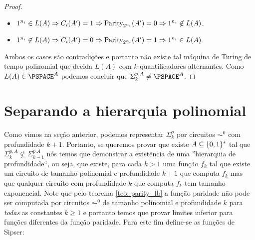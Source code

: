 \begin{proof}
\begin{itemize}

    \item $1^{n_{i}} \in L(A) \Rightarrow C_{i}(A^{\prime}) = 1 \Rightarrow \text{Parity}_{2^{n_{i}}}(A^{\prime}) = 0 \Rightarrow 1^{n_{i}} \not\in L(A)$.

    \item $1^{n_{i}} \not\in L(A) \Rightarrow C_{i}(A^{\prime}) = 0 \Rightarrow \text{Parity}_{2^{n_{i}}}(A^{\prime}) = 1 \Rightarrow 1^{n_{i}} \in L(A)$.

\end{itemize}

Ambos os casos são contradições e portanto não existe tal máquina de Turing de tempo polinomial que decida $L(A)$ com $k$ quantificadores alternantes. Como $L(A) \in \PSPACE^{A}$ podemos concluir que $\Sigma_{k}^{p, A} \neq \PSPACE^{A}$.

\end{proof}



\section{Separando a hierarquia polinomial} \label{section_separating_PH}

Como vimos na seção anterior, podemos representar $\Sigma_{k}^{p}$ por circuitos $\AC^{0}$ com profundidade $k + 1$. Portanto, se queremos provar que existe $A \subseteq \{0, 1\}^{*}$ tal que $\Sigma_{k}^{p, A} \not\subseteq \Sigma_{k - 1}^{p. A}$ nós temos que demonstrar a existência de uma ''hierarquia de profundidade``, ou seja, que existe, para cada $k > 1$ uma função $f_{k}$ tal que existe um circuito de tamanho polinomial e profundidade $k + 1$ que computa $f_{k}$ mas que qualquer circuito com profundidade $k$ que computa $f_{k}$ tem tamanho exponencial. Note que pelo teorema \ref{teo: parity_lb} a função paridade não pode ser computada por circuitos $\AC^{0}$ de tamanho polinomial e profundidade $k$ para \emph{todas} as constantes $k \geq 1$ e portanto temos que provar limites inferior para funções diferentes da função paridade. Para este fim define-se as funções de Sipser:

